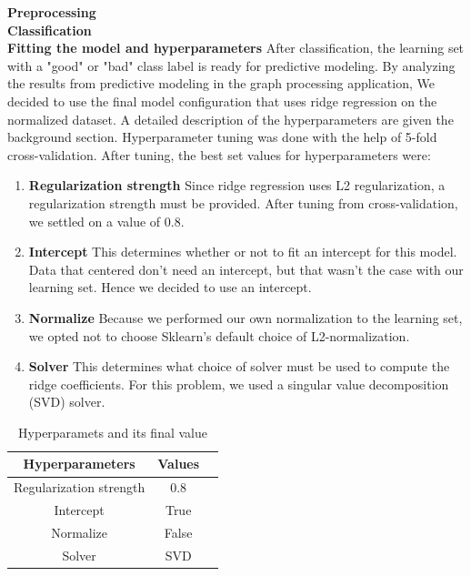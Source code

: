 \textbf{Preprocessing}\\
\textbf{Classification}\\

\textbf{Fitting the model and hyperparameters}
After classification, the learning set with a "good" or "bad" class label is ready for predictive modeling. By analyzing the results from predictive modeling in the graph processing application, We decided to use the final model configuration that uses ridge regression on the normalized dataset. A detailed description of the hyperparameters are given the background section. Hyperparameter tuning was done with the help of 5-fold cross-validation. After tuning, the best set values for hyperparameters were:\\

\begin{enumerate}


    \item \textbf{Regularization strength}
Since ridge regression uses L2 regularization, a regularization strength must be provided. After tuning from cross-validation, we settled on a value of 0.8.

    \item \textbf{Intercept}
This determines whether or not to fit an intercept for this model. Data that centered don't need an intercept, but that wasn't the case with our learning set. Hence we decided to use an intercept.

    \item \textbf{Normalize}
Because we performed our own normalization to the learning set, we opted not to choose Sklearn's default choice of L2-normalization.
    
    \item \textbf{Solver}
This determines what choice of solver must be used to compute the ridge coefficients. For this problem, we used a singular value decomposition (SVD) solver.
    
\end{enumerate}



\begin{table}
\centering
\caption{Hyperparamets and its final value}
\label{Hyperparamets and its final value}
\begin{tabular}{|c|c|c|}    \hline  

Hyperparameters                                 & Values\\ \hline\hline
Regularization strength                         & 0.8 \\ \hline
Intercept                         & True  \\ \hline
Normalize                    & False  \\ \hline
Solver                      & SVD \\ \hline

\end{tabular}
\end{table}


